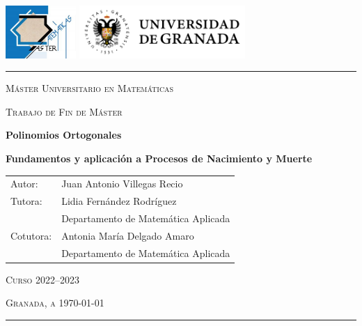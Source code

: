 \begin{titlepage}
	\includegraphics[height=20mm]{img/logoMastermat.png}
	\hfill
	\includegraphics[height=20mm]{img/LogoUGRLargo.png}
	\hspace{1cm}

\vspace{0.5cm}
\hrule
\vspace{1cm}
{\Large\centering \textsc{Máster Universitario en Matemáticas} \par}
{\Large\centering \textsc{Trabajo de Fin de Máster} \par}


	\vspace{1cm}
	{\Huge\centering \textbf{Polinomios Ortogonales} \par}
	\vspace{0.5cm}
	{\LARGE\centering \textbf{Fundamentos y aplicación a Procesos de Nacimiento y Muerte} \par}

	\vfill
	\begin{table}[h!]
			\begin{tabular}{p{}p{}}
				{\LARGE Autor:} & {\LARGE Juan Antonio Villegas Recio} \\[1cm]
				{\Large Tutora:}    & {\Large Lidia Fernández Rodríguez} \\
				& {\Large Departamento de Matemática Aplicada} \\ [0.5cm]
				{\Large Cotutora:}      & {\Large Antonia María Delgado Amaro} \\
				& {\Large Departamento de Matemática Aplicada} 
			\end{tabular}
	\end{table}
	
	\vfill
	{\Large\centering \textsc{Curso 2022--2023} \par}
	{\Large\centering \textsc{Granada, a \today} \par}
	\vspace{1cm}

	\hrule
	\vspace{0.3cm}
	
	
	
\end{titlepage}
